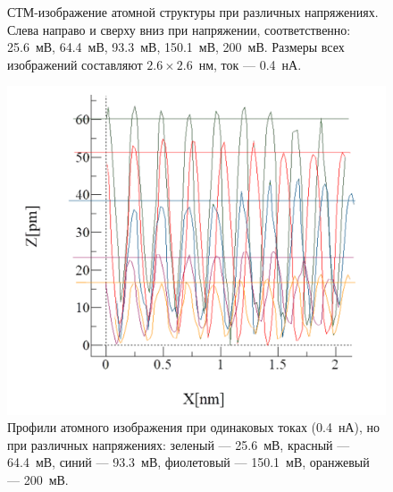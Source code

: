 \documentclass[a4paper, 12pt]{article}
\begin{document}
\begin{figure}[H]
		\caption{СТМ-изображение атомной структуры при различных напряжениях. Слева направо и сверху вниз при напряжении, соответственно: 25.6~мВ, 64.4~мВ, 93.3~мВ, 150.1~мВ, 200~мВ. Размеры всех изображений составляют $2.6\times2.6$~нм, ток --- 0.4~нА.}
		\label{fig:2_different_volt}
	\end{figure}

	\begin{figure}[H]
		\centering
		\includegraphics[width=0.9\linewidth]{../STM_data/STM_Profiles_new/Graphs/All_graphs}
		\caption{Профили атомного изображения при одинаковых токах (0.4~нА), но при различных напряжениях: зеленый --- 25.6~мВ, красный --- 64.4~мВ, синий --- 93.3~мВ, фиолетовый --- 150.1~мВ, оранжевый --- 200~мВ.}
		\label{fig:2_different_volt_profiles}
	\end{figure}
	
\end{document}
